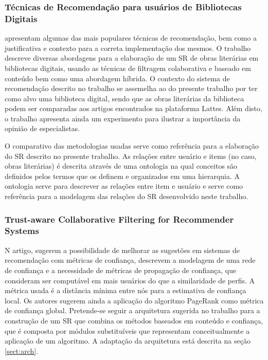 \documentclass[12pt]{article}
\begin{document}
\subsubsection{Técnicas de Recomendação para usuários de Bibliotecas
Digitais}

\cite{primo2006tecnicas} apresentam algumas das mais populares técnicas de recomendação, bem como a justificativa e contexto para a 
correta implementação dos mesmos. O trabalho descreve diversas abordagens para a elaboração de um SR de obras literárias 
em bibliotecas digitais, usando as técnicas de filtragem colaborativa e baseado em conteúdo bem como uma abordagem híbrida. 
O contexto do sistema de recomendação descrito no trabalho se assemelha ao do presente trabalho por ter como alvo uma 
biblioteca digital, sendo que as obras literárias da biblioteca podem ser comparadas aos artigos encontrados na plataforma 
Lattes. Além disto, o trabalho apresenta ainda um experimento para ilustrar a importância da opinião de especialistas.

O comparativo das metodologias usadas serve como referência para a elaboração do SR descrito no presente trabalho. 
As relações entre usuário e items (no caso, obras literárias) é descrita através de uma ontologia na qual conceitos são 
definidos pelos termos que os definem e organizados em uma hierarquia. A ontologia serve para descrever as relações entre 
item e usuário e serve como referência para a modelagem das relações do SR desenvolvido neste trabalho.

\subsubsection{Trust-aware Collaborative Filtering for Recommender Systems}

N artigo, \cite{massa2004trust} sugerem a possibilidade de melhorar as sugestões em sistemas de recomendação com métricas de confiança, descrevem a modelagem de uma rede de confiança e a necessidade de métricas de propagação de confiança, que consideram ser computável em 
mais usuários do que a similaridade de perfis. A métrica usada é a distância mínima entre nós para a estimativa de 
confiança local. Os autores sugerem ainda a aplicação do algoritmo PageRank \cite{page1999pagerank} como métrica de confiança global. Pretende-se seguir a arquitetura sugerida no trabalho para a construção de um SR que combina os métodos baseados em 
conteúdo e confiança, que é composta por módulos substituíveis que representam conceitualmente a aplicação de um algoritmo. A adaptação da arquitetura está descrita na seção \ref{sect:arch}.
\end{document}
